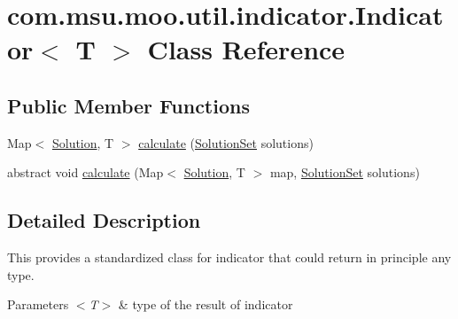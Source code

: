\hypertarget{classcom_1_1msu_1_1moo_1_1util_1_1indicator_1_1Indicator_3_01T_01_4}{\section{com.\-msu.\-moo.\-util.\-indicator.\-Indicator$<$ T $>$ Class Reference}
\label{classcom_1_1msu_1_1moo_1_1util_1_1indicator_1_1Indicator_3_01T_01_4}
}
\subsection*{Public Member Functions}
\begin{DoxyCompactItemize}
\item 
Map$<$ \hyperlink{classcom_1_1msu_1_1moo_1_1model_1_1solution_1_1Solution}{Solution}, T $>$ \hyperlink{classcom_1_1msu_1_1moo_1_1util_1_1indicator_1_1Indicator_3_01T_01_4_ae3ab82087a1693527e8efb67d505d9c9}{calculate} (\hyperlink{classcom_1_1msu_1_1moo_1_1model_1_1solution_1_1SolutionSet}{Solution\-Set} solutions)
\item 
abstract void \hyperlink{classcom_1_1msu_1_1moo_1_1util_1_1indicator_1_1Indicator_3_01T_01_4_abcaeb04edbfd93448aacd930dee06b49}{calculate} (Map$<$ \hyperlink{classcom_1_1msu_1_1moo_1_1model_1_1solution_1_1Solution}{Solution}, T $>$ map, \hyperlink{classcom_1_1msu_1_1moo_1_1model_1_1solution_1_1SolutionSet}{Solution\-Set} solutions)
\end{DoxyCompactItemize}


\subsection{Detailed Description}
This provides a standardized class for indicator that could return in principle any type.


\begin{DoxyParams}{Parameters}
{\em $<$\-T$>$} & type of the result of indicator \\
\hline
\end{DoxyParams}


